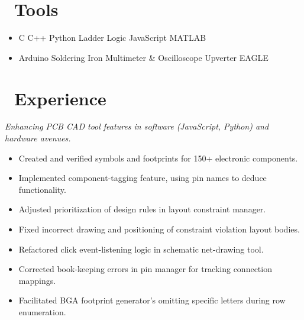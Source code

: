 \documentclass{resume}
\begin{document}



\section{\faWrench\ Tools}

\begin{itemize}[parsep=0.5ex]
  \item %
  C\textperiodcentered 
  C++\textperiodcentered
  Python\textperiodcentered
  Ladder Logic\textperiodcentered
  JavaScript\textperiodcentered
  MATLAB%
  \item %
  Arduino\textperiodcentered
  Soldering Iron\textperiodcentered
  Multimeter \& Oscilloscope\textperiodcentered
  Upverter\textperiodcentered
  EAGLE
\end{itemize}

\section{\faLineChart\ Experience}

\textit{Enhancing PCB CAD tool features in software (JavaScript, Python) and hardware avenues.}
\begin{itemize}
  \item Created and verified symbols and footprints for 150+ electronic components.
  \item Implemented component-tagging feature, using pin names to deduce functionality.
  \item Adjusted prioritization of design rules in layout constraint manager.
  \item Fixed incorrect drawing and positioning of constraint violation layout bodies.
  \item Refactored click event-listening logic in schematic net-drawing tool.
  \item Corrected book-keeping errors in pin manager for tracking connection mappings.
  \item Facilitated BGA footprint generator's omitting specific letters during row enumeration.
\end{itemize}
\end{document}
